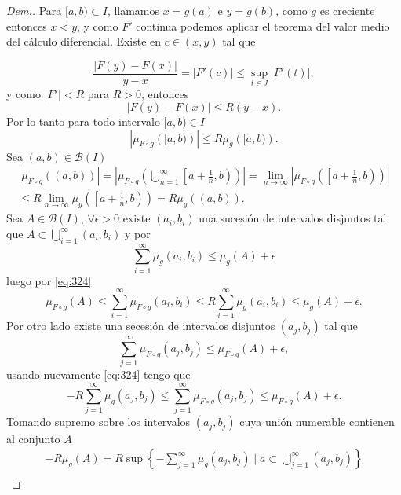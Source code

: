 \begin{proof}[Dem.]

Para $[a,b)\subset I$, llamamos $x=g(a)$ e $y=g(b)$, como $g$ es creciente entonces $x<y$, y como $F'$ continua podemos aplicar el  teorema del valor medio del cálculo diferencial. Existe en $c\in (x,y)$ tal que 

	$$ \dfrac{|F(y)-F(x)|}{y-x} =  |F'(c)| \leq \sup_{t\in J}\left|F'(t) \right|, $$
	y como $|F'|<R$ para $R>0$, entonces
	\begin{equation} \label{eq:f'}
		 |F(y)-F(x)| \leq R (y-x).
	\end{equation}
Por lo tanto para todo intervalo $[a,b)\in I$
	\begin{equation*}
		|\mu_{F\circ g}\left( [a,b)\right)|\leq R\mu_{g}\left( [a,b)\right).
		\label{eq:medidas}
	\end{equation*}
 Sea $(a,b)\in \mathcal{B}(I)$ 
\begin{multline}\label{eq:324}
    |\mu_{F\circ g}((a,b))|=\left|\mu_{F\circ g}\left(\bigcup_{n=1}^{\infty}\left[a+\frac{1}{n},b\right)\right)\right|=\lim_{n\to \infty}\left|\mu_{F\circ g}\left(\left[a+\frac{1}{n},b\right)\right)\right|\\
    \leq R\lim_{n\to \infty}\mu_{g}\left(\left[a+\frac{1}{n},b\right)\right)=R\mu_g((a,b)).
\end{multline}
Sea $A\in \mathcal{B}(I)$, $\forall \epsilon>0$ existe $(a_i,b_i)$ una sucesión de intervalos disjuntos tal que $A\subset \displaystyle\bigcup_{i=1}^{\infty}(a_i,b_i)$ y  por  \cite[Lema 1.7]{folland} 
$$\sum_{i=1}^{\infty}\mu_{ g}(a_i,b_i)\leq \mu_g(A)+\epsilon$$
luego por \ref{eq:324}
\begin{equation}
    \mu_{F\circ g}(A)\leq \sum_{i=1}^{\infty}\mu_{F\circ g}(a_i,b_i)\leq R\sum_{i=1}^{\infty}\mu_{ g}(a_i,b_i)\leq \mu_g(A)+\epsilon.\label{eq:<}
\end{equation}
Por otro lado existe una secesión de intervalos disjuntos $(a_j,b_j)$ tal que 
$$\sum_{j=1}^{\infty}\mu_{F\circ g}(a_j,b_j)\leq \mu_{F\circ g}(A)+\epsilon,$$
usando nuevamente \ref{eq:324} tengo que 
\begin{equation*}
-R\sum_{j=1}^{\infty}\mu_{ g}(a_j,b_j)\leq \sum_{j=1}^{\infty}\mu_{F\circ g}(a_j,b_j)\leq \mu_{F\circ g}(A)+\epsilon.
\end{equation*}
Tomando supremo sobre los intervalos $(a_j,b_j)$ cuya unión numerable contienen al conjunto $A$
\begin{multline}
    -R\mu_g(A)=R\sup\left\{ -\sum_{j=1}^{\infty}\mu_{ g}(a_j,b_j)  \mid a\subset \bigcup_{j=1}^{\infty}(a_j,b_j) \right\}\\

\end{multline}
\end{proof}

